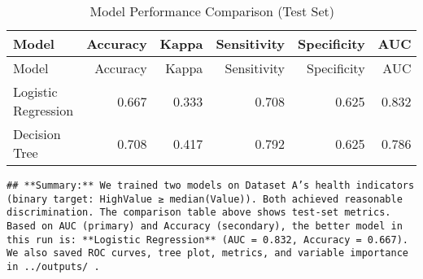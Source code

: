 \documentclass[
]{article}
\begin{document}
\begin{longtable}[]{@{}lrrrrr@{}}
\caption{Model Performance Comparison (Test Set)}\tabularnewline
\toprule\noalign{}
Model & Accuracy & Kappa & Sensitivity & Specificity & AUC \\
\midrule\noalign{}
\endfirsthead
\toprule\noalign{}
Model & Accuracy & Kappa & Sensitivity & Specificity & AUC \\
\midrule\noalign{}
\endhead
\bottomrule\noalign{}
\endlastfoot
Logistic Regression & 0.667 & 0.333 & 0.708 & 0.625 & 0.832 \\
Decision Tree & 0.708 & 0.417 & 0.792 & 0.625 & 0.786 \\
\end{longtable}

\begin{verbatim}
## **Summary:** We trained two models on Dataset A’s health indicators (binary target: HighValue ≥ median(Value)). Both achieved reasonable discrimination. The comparison table above shows test-set metrics. Based on AUC (primary) and Accuracy (secondary), the better model in this run is: **Logistic Regression** (AUC = 0.832, Accuracy = 0.667). We also saved ROC curves, tree plot, metrics, and variable importance in ../outputs/ .
\end{verbatim}
\end{document}
